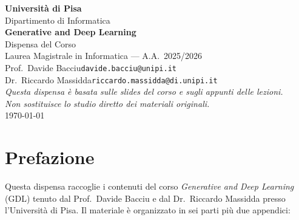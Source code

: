 \documentclass[11pt,a4paper,openany]{book}
\theoremstyle{definition}
\begin{document}

\begin{titlepage}
\centering
\vspace*{2cm}
{\LARGE \textbf{Università di Pisa}\\[0.5em]
Dipartimento di Informatica\\[2em]}
{\Huge\textbf{Generative and Deep Learning}\\[1em]}
{\Large Dispensa del Corso\\[0.5em]}
{\large Laurea Magistrale in Informatica — A.A.\ 2025/2026\\[3em]}
{\large
Prof.\ Davide Bacciu\quad\texttt{davide.bacciu@unipi.it}\\[0.5em]
Dr.\ Riccardo Massidda\quad\texttt{riccardo.massidda@di.unipi.it}\\[4em]}
{\normalsize
\textit{Questa dispensa è basata sulle slides del corso e sugli appunti delle lezioni.\\
Non sostituisce lo studio diretto dei materiali originali.}\\[2em]}
{\large \today}
\vfill
\end{titlepage}

\tableofcontents
\cleardoublepage

\chapter*{Prefazione}

Questa dispensa raccoglie i contenuti del corso \textit{Generative and Deep Learning} (GDL) tenuto dal Prof.\ Davide Bacciu e dal Dr.\ Riccardo Massidda presso l'Università di Pisa. Il materiale è organizzato in sei parti più due appendici:
\end{document}
